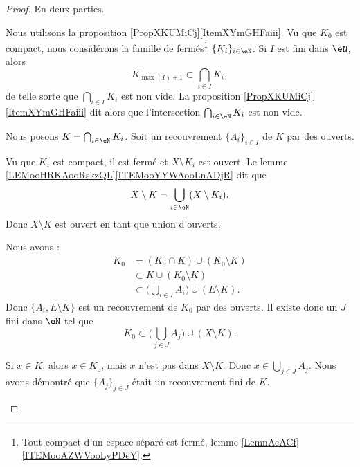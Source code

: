 \begin{proof}
	En deux parties.
	\begin{subproof}
		Nous utilisons la proposition \ref{PropXKUMiCj}\ref{ItemXYmGHFaiii}. Vu que \( K_0\) est compact, nous considérons la famille de fermés\footnote{Tout compact d'un espace séparé est fermé, lemme \ref{LemnAeACf}\ref{ITEMooAZWVooLyPDeY}.} \( \{ K_i \}_{i\in \eN}\). Si \( I\) est fini dans \( \eN\), alors
		\begin{equation}
			K_{\max(I)+1}\subset\bigcap_{i\in I}K_i,
		\end{equation}
		de telle sorte que \( \bigcap_{i\in I}K_i\) est non vide. La proposition \ref{PropXKUMiCj}\ref{ItemXYmGHFaiii} dit alors que l'intersection \( \bigcap_{i\in \eN}K_i\) est non vide.

		Nous posons \( K=\bigcap_{i\in \eN}K_i\). Soit un recouvrement \( \{ A_i \}_{i\in I}\) de \( K\) par des ouverts.

		\begin{subproof}
			Vu que \( K_i\) est compact, il est fermé et \( X\setminus K_i\) est ouvert. Le lemme \ref{LEMooHRKAooRskzQL}\ref{ITEMooYYWAooLnADjR} dit que
			\begin{equation}
				X\setminus K=\bigcup_{i\in \eN}(X\setminus K_i).
			\end{equation}
			Donc \( X\setminus K\) est ouvert en tant que union d'ouverts.


			Nous avons :
			\begin{subequations}
				\begin{align}
					K_0 & =(K_0\cap K)\cup(K_0\setminus K)                           \\
					    & \subset K\cup(K_0\setminus K)                              \\
					    & \subset\Big( \bigcup_{i\in I}A_i \Big)\cup (E\setminus K).
				\end{align}
			\end{subequations}
			Donc \( \{ A_i,E\setminus K \}\) est un recouvrement de \( K_0\) par des ouverts. Il existe donc un \( J\) fini dans \( \eN\) tel que
			\begin{equation}
				K_0\subset \big( \bigcup_{j\in J}A_j \big)\cup(X\setminus K).
			\end{equation}

			Si \( x\in K\), alors \( x\in K_0\), mais \( x\) n'est pas dans \( X\setminus K\). Donc \( x\in \bigcup_{j\in J}A_j\). Nous avons démontré que \( \{ A_j \}_{j\in J}\) était un recouvrement fini de \( K\).
		\end{subproof}
	\end{subproof}
\end{proof}


